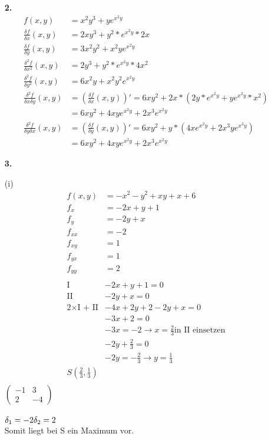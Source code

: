 \documentclass[a4paper,11pt,fleqn]{scrartcl}
\begin{document}
\begin{enumerate}
\item[\textbf{2.}]
	\begin{align*}
		f(x,y)&=x^2y^3+ye^{x^2y}\\
		\frac{\delta f}{\delta x}(x,y)&=2xy^3+y^2*e^{x^2y}*2x\\
		\frac{\delta f}{\delta y}(x,y)&=3x^2y^2+x^2ye^{x^2y}\\
		\frac{\delta^2 f}{\delta x^2}(x,y)&=2y^3+y^2*e^{x^2y}*4x^2\\
		\frac{\delta^2 f}{\delta y^2}(x,y)&=6x^2y+x^2y^2e^{x^2y}\\
		\frac{\delta^2 f}{\delta x \delta y}(x,y)&=\left( \frac{\delta f}{\delta x}(x,y) \right)'=6xy^2+2x*\left( 2y*e^{x^2y} + ye^{x^2y}*x^2 \right)\\
		&=6xy^2+4xye^{x^2y}+2x^3e^{x^2y}\\
		\frac{\delta^2 f}{\delta y \delta x}(x,y)&=\left( \frac{\delta f}{\delta y}(x,y) \right)'=6xy^2+y*\left( 4xe^{x^2y}+2x^3ye^{x^2y} \right)\\
		&=6xy^2+4xye^{x^2y}+2x^3e^{x^2y}
	\end{align*}

\item[\textbf{3.}]
	\item[(i)]
	\begin{align*}
		f(x,y) &= -x^2-y^2+xy+x+6\\
		f_{x} &= -2x + y + 1\\
		f_{y}&= -2y +x\\
		f_{xx} &= -2\\
		f_{xy} &= 1\\
		f_{yx} &= 1\\
		f_{yy} &= 2\\\\
		\text{I }&-2x +y+1=0\\
		\text{II }&-2y+x=0\\
		\text{2} \times \text{I + II} &-4x+2y+2-2y+x=0\\
		&-3x+2=0\\
		&-3x=-2 \rightarrow x =\frac{2}{3} \text{in II einsetzen}\\
		&-2y+ \frac{2}{3} = 0\\
		&-2y = -\frac{2}{3} \rightarrow y = \frac{1}{3}\\
		S\left(\frac{2}{3},\frac{1}{3}\right)\\
	\end{align*}
	$\left(\begin{matrix}
 		 -1 & 3 \\
 		 2 & -4
	 \end{matrix}\right)$\\\\
	 $ \delta_{1}=-2\\ \delta_{2}=2$\\
	 Somit liegt bei S ein Maximum vor.\\
	 

\end{enumerate}
\end{document}
